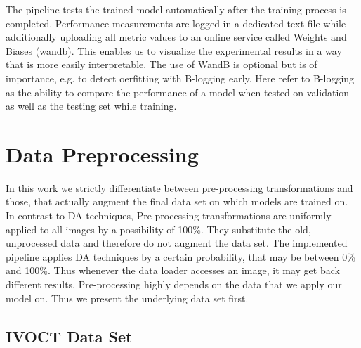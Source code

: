 The pipeline tests the trained model automatically after the training process is completed. Performance measurements are logged in a dedicated text file while additionally uploading all metric values to an online service called Weights and Biases (\Gls{wandb}). This enables us to visualize the experimental results in a way that is more easily interpretable. The use of WandB is optional but is of importance, e.g. to detect oerfitting with B-logging early. Here refer to B-logging as the ability to compare the performance of a model when tested on validation as well as the testing set while training.

\section{Data Preprocessing}

In this work we strictly differentiate between pre-processing transformations and those, that actually augment the final data set on which models are trained on. In contrast to DA techniques, Pre-processing transformations are uniformly applied to all images by a possibility of 100\%. They substitute the old, unprocessed data and therefore do not augment the data set. The implemented pipeline applies DA techniques by a certain probability, that may be between 0\% and 100\%. Thus whenever the data loader accesses an image, it may get back different results. Pre-processing highly depends on the data that we apply our model on. Thus we present the underlying data set first.

\subsection{IVOCT Data Set}

